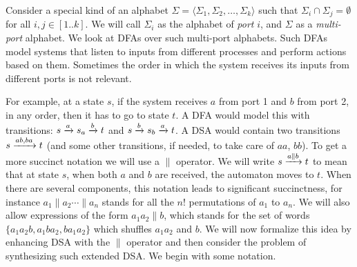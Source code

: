 \label{sec:multi-port-inputs}%


Consider a special kind of an alphabet
$\Sigma = \langle \Sigma_1, \Sigma_2, \dots, \Sigma_k \rangle$ such
that $\Sigma_i \cap \Sigma_j = \emptyset$ for all $i, j \in
[1..k]$. We will call $\Sigma_i$ as the alphabet of \emph{port} $i$,
and $\Sigma$ as a \emph{multi-port} alphabet. We
look at DFAs over such multi-port alphabets. Such DFAs model systems
that listen to inputs from different processes and perform actions
based on them. Sometimes the order in which the system receives its
inputs from different ports is not relevant.%

For example, at a state
$s$, if the system receives $a$ from port 1 and $b$ from port 2, in any
order, then it has to go to state $t$.  A DFA would model this with
transitions: $s \xrightarrow{a} s_a \xrightarrow{b} t$ and $s \xrightarrow{b} s_b \xrightarrow{a}
t$. A DSA would contain two transitions $s \xrightarrow{ab, ba} t$ (and some
other transitions, if needed, to take care of $aa$, $bb$). To get a
more succinct notation we will use a $\parallel$ operator. We will
write $s \xrightarrow{a \parallel b} t$ to mean that at state $s$, when
both $a$ and $b$ are received, the automaton moves to $t$. When there
are several components, this notation leads to significant
succinctness, for instance $a_1 \parallel a_2 \cdots \parallel a_n$
stands for all the $n!$ permutations of $a_1$ to $a_n$. We will also
allow expressions of the form $a_1 a_2 \parallel b$, which stands for
the set of words $\{a_1 a_2 b, a_1 b a_2, b a_1 a_2\}$ which shuffles
$a_1a_2$ and $b$. We will now formalize this idea by enhancing DSA with
the $\parallel$ operator and then consider the problem of synthesizing
such extended DSA. We begin with some notation.%




